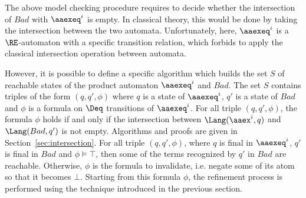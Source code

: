 The above model checking procedure requires to decide whether the
intersection of $Bad$ with $\aaexeq^i$ is empty. In classical theory,
this would be done by taking the intersection between the two
automata. Unfortunately, here, $\aaexeq^i$ is a $\RE$-automaton with a
specific transition relation, which forbids to apply the classical
intersection operation between automata.


However, it is possible to define a specific algorithm which builds
the set $S$ of reachable states of the product automaton $\aaexeq^i$
and $Bad$. The set $S$ contains triples of the form $(q,q',\phi)$
where $q$ is a state of $\aaexeq^i$, $q'$ is a state of $Bad$ and
$\phi$ is a formula on $\Deq$ transitions of $\aaexeq^i$. For all
triple $(q,q',\phi)$, the formula $\phi$ holds if and only if the
intersection between $\Lang(\aaex^i,q)$ and $\Lang(Bad,q')$ is not
empty. Algorithms and proofs are given in
Section~\ref{sec:intersection}. For all triple $(q,q',\phi)$, where
$q$ is final in $\aaexeq^i$, $q'$ is final in $Bad$ and $\phi \models
\top$, then some of the terms recognized by $q'$ in $Bad$ are
reachable.  Otherwise, $\phi$ is the formula to invalidate,
i.e. negate some of its atom so that it becomes $\bot$. Starting from
this formula $\phi$, the refinement process is performed using the
technique introduced in the previous section.


